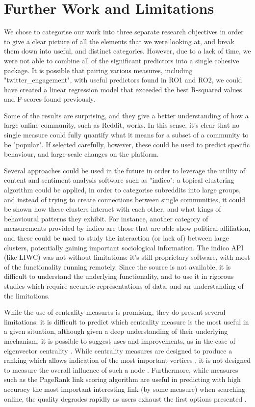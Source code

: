 \documentclass[bsc,frontabs,twoside,singlespacing,parskip,deptreport]{infthesis}
\begin{document}
\section{Further Work and Limitations}\label{further-work}

We chose to categorise our work into three separate research objectives in order to give a clear picture of all the elements that we were looking at, and break them down into useful, and distinct categories. However, due to a lack of time, we were not able to combine all of the significant predictors into a single cohesive package. It is possible that pairing various measures, including "twitter\_engagement", with useful predictors found in RO1 and RO2, we could have created a linear regression model that exceeded the best R-squared values and F-scores found previously. 

Some of the results are surprising, and they give a better understanding of how a large online community, such as Reddit, works. In this sense, it's clear that no single measure could fully quantify what it means for a subset of a community to be "popular". If selected carefully, however, these could be used to predict specific behaviour, and large-scale changes on the platform. 

Several approaches could be used in the future in order to leverage the utility of content and sentiment analysis software such as "indico": a topical clustering algorithm could be applied, in order to categorise subreddits into large groups, and instead of trying to create connections between single communities, it could be shown how these clusters interact with each other, and what kings of behavioural patterns they exhibit. For instance, another category of measurements provided by indico are those that are able show political affiliation, and these could be used to study the interaction (or lack of) between large clusters, potentially gaining important sociological information. The indico API (like LIWC) was not without limitations: it's still proprietary software, with most of the functionality running remotely. Since the source is not available, it is difficult to understand the underlying functionality, and to use it in rigorous studies which require accurate representations of data, and an understanding of the limitations.

While the use of centrality measures is promising, they do present several limitations: it is difficult to predict which centrality measure is the most useful in a given situation, although given a deep understanding of their underlying mechanism, it is possible to suggest uses and improvements, as in the case of eigenvector centrality \cite{pagerank}. While centrality measures are designed to produce a ranking which allows indication of the most important vertices \cite{centrality1}, it is not designed to measure the overall influence of such a node \cite{centrality2}. Furthermore, while measures such as the PageRank link scoring algorithm are useful in predicting with high accuracy the most important interesting link (by some measure) when searching online, the quality degrades rapidly as users exhaust the first options presented \cite{centrality3}.
\end{document}
